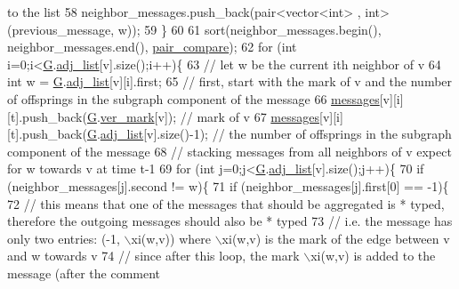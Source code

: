 \begin{DoxyCode}
{       to the list}
58           neighbor\_messages.push\_back(pair<vector<int> , \textcolor{keywordtype}{int}> (previous\_message, w));
59         \}
60 
61         sort(neighbor\_messages.begin(), neighbor\_messages.end(), \hyperlink{graph__message_8cpp_a7ffcf0e75a9eec8eb0b05c92ead511de}{pair\_compare});
62         \textcolor{keywordflow}{for} (\textcolor{keywordtype}{int} i=0;i<\hyperlink{classgraph__message_abffce6d6a7868da0e747425569759f0f}{G}.\hyperlink{classmarked__graph_a1a0bf7ca413a278763f7c878b3b6fd6f}{adj\_list}[v].size();i++)\{
63           \textcolor{comment}{// let w be the current ith neighbor of v}
64           \textcolor{keywordtype}{int} w = \hyperlink{classgraph__message_abffce6d6a7868da0e747425569759f0f}{G}.\hyperlink{classmarked__graph_a1a0bf7ca413a278763f7c878b3b6fd6f}{adj\_list}[v][i].first;
65           \textcolor{comment}{// first, start with the mark of v and the number of offsprings in the subgraph component of the
       message}
66           \hyperlink{classgraph__message_a06a1d1ab91b4891c65ea80205566f800}{messages}[v][i][t].push\_back(\hyperlink{classgraph__message_abffce6d6a7868da0e747425569759f0f}{G}.\hyperlink{classmarked__graph_ac83e9377dd4d8bb95be1ac949b127296}{ver\_mark}[v]); \textcolor{comment}{// mark of v}
67           \hyperlink{classgraph__message_a06a1d1ab91b4891c65ea80205566f800}{messages}[v][i][t].push\_back(\hyperlink{classgraph__message_abffce6d6a7868da0e747425569759f0f}{G}.\hyperlink{classmarked__graph_a1a0bf7ca413a278763f7c878b3b6fd6f}{adj\_list}[v].size()-1); \textcolor{comment}{// the number of offsprings
       in the subgraph component of the message}
68           \textcolor{comment}{// stacking messages from all neighbors of v expect for w towards v at time t-1}
69           \textcolor{keywordflow}{for} (\textcolor{keywordtype}{int} j=0;j<\hyperlink{classgraph__message_abffce6d6a7868da0e747425569759f0f}{G}.\hyperlink{classmarked__graph_a1a0bf7ca413a278763f7c878b3b6fd6f}{adj\_list}[v].size();j++)\{
70             \textcolor{keywordflow}{if} (neighbor\_messages[j].second != w)\{
71               \textcolor{keywordflow}{if} (neighbor\_messages[j].first[0] == -1)\{
72                 \textcolor{comment}{// this means that one of the messages that should be aggregated is * typed, therefore the
       outgoing messages should also be * typed}
73                 \textcolor{comment}{// i.e. the message has only two entries: (-1, \(\backslash\)xi(w,v)) where \(\backslash\)xi(w,v) is the mark of the
       edge between v and w towards v}
74                 \textcolor{comment}{// since after this loop, the mark \(\backslash\)xi(w,v) is added to the message (after the comment
}
\end{DoxyCode}
